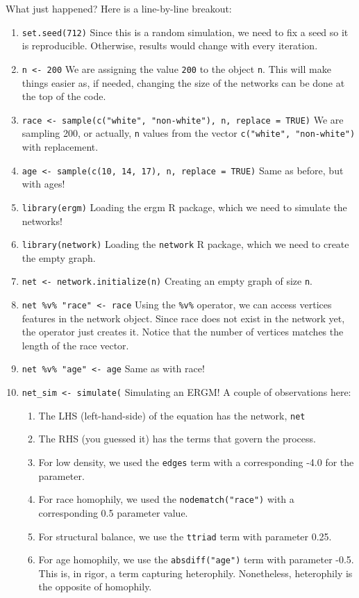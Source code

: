 \documentclass[]{book}
\begin{document}
What just happened? Here is a line-by-line breakout:

\begin{enumerate}
\def\labelenumi{\arabic{enumi}.}
\item
  \texttt{set.seed(712)} Since this is a random simulation, we need to fix a seed so it is reproducible. Otherwise, results would change with every iteration.
\item
  \texttt{n\ \textless{}-\ 200} We are assigning the value \texttt{200} to the object \texttt{n}. This will make things easier as, if needed, changing the size of the networks can be done at the top of the code.
\item
  \texttt{race\ \textless{}-\ sample(c("white",\ "non-white"),\ n,\ replace\ =\ TRUE)} We are sampling 200, or actually, \texttt{n} values from the vector \texttt{c("white",\ "non-white")} with replacement.
\item
  \texttt{age\ \textless{}-\ sample(c(10,\ 14,\ 17),\ n,\ replace\ =\ TRUE)} Same as before, but with ages!
\item
  \texttt{library(ergm)} Loading the ergm R package, which we need to simulate the networks!
\item
  \texttt{library(network)} Loading the \texttt{network} R package, which we need to create the empty graph.
\item
  \texttt{net\ \textless{}-\ network.initialize(n)} Creating an empty graph of size \texttt{n}.
\item
  \texttt{net\ \%v\%\ "race"\ \textless{}-\ race} Using the \texttt{\%v\%} operator, we can access vertices features in the network object. Since race does not exist in the network yet, the operator just creates it. Notice that the number of vertices matches the length of the race vector.
\item
  \texttt{net\ \%v\%\ "age"\ \textless{}-\ age} Same as with race!
\item
  \texttt{net\_sim\ \textless{}-\ simulate(} Simulating an ERGM! A couple of observations here:

  \begin{enumerate}
  \def\labelenumii{\alph{enumii}.}
  \item
    The LHS (left-hand-side) of the equation has the network, \texttt{net}
  \item
    The RHS (you guessed it) has the terms that govern the process.
  \item
    For low density, we used the \texttt{edges} term with a corresponding
    -4.0 for the parameter.
  \item
    For race homophily, we used the \texttt{nodematch("race")} with a
    corresponding 0.5 parameter value.
  \item
    For structural balance, we use the \texttt{ttriad} term with parameter
    0.25.
  \item
    For age homophily, we use the \texttt{absdiff("age")} term with parameter
    -0.5. This is, in rigor, a term capturing heterophily. Nonetheless,
    heterophily is the opposite of homophily.
  \end{enumerate}
\end{enumerate}
\end{document}
